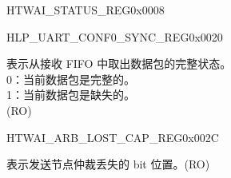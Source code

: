 \begin{register}{H}{TWAI\_STATUS\_REG}{0x0008}
\begin{regdesc}
\begin{reglist}
\item [见下页...]
\end{reglist}\end{regdesc}
\end{register}

\addtocounter{Regfloat}{-1}
\begin{register}{H}{LP\_UART\_CONF0\_SYNC\_REG}{0x0020}
\begin{regdesc}\begin{reglist}
\item [接上页...]

\label{fielddesc:TWAISTATUSMISS}\item [TWAI\_STATUS\_MISS] 表示从接收 FIFO 中取出数据包的完整状态。\\
0：当前数据包是完整的。\\
1：当前数据包是缺失的。\\
(RO)
\end{reglist}\end{regdesc}
\end{register}


\begin{register}{H}{TWAI\_ARB\_LOST\_CAP\_REG}{0x002C}\label{regdesc:TWAIARBLOSTCAPREG}
%
%
\regnewline%
\begin{regdesc}\begin{reglist}
\label{fielddesc:TWAIARBITRATIONLOSTCAPTURE}\item [TWAI\_ARBITRATION\_LOST\_CAPTURE] 表示发送节点仲裁丢失的 bit 位置。(RO)
\end{reglist}\end{regdesc}
\end{register}



